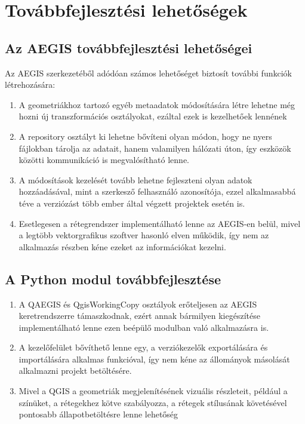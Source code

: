 \section{Továbbfejlesztési lehetőségek}
\subsection{Az AEGIS továbbfejlesztési lehetőségei}
Az AEGIS szerkezetéből adódóan számos lehetőséget biztosít további funkciók létrehozására:
\begin{enumerate}
	\item A geometriákhoz tartozó egyéb metaadatok módosítására létre lehetne még hozni új transzformációs osztályokat, ezáltal ezek is kezelhetőek lennének
	\item A repository osztályt ki lehetne bővíteni olyan módon, hogy ne nyers fájlokban tárolja az adatait, hanem valamilyen hálózati úton, így eszközök közötti kommunikáció is megvalósítható lenne.
	\item A módosítások kezelését tovább lehetne fejleszteni olyan adatok hozzáadásával, mint a szerkesző felhasználó azonosítója, ezzel alkalmasabbá téve a verziózást több ember által végzett projektek esetén is.
	\item Esetlegesen a rétegrendszer implementálható lenne az AEGIS-en belül, mivel a legtöbb vektorgrafikus szoftver hasonló elven működik, így nem az alkalmazás részben kéne ezeket az információkat kezelni.
\end{enumerate}
\subsection{A Python modul továbbfejlesztése}
\begin{enumerate}
	\item A QAEGIS és QgisWorkingCopy osztályok erőteljesen az AEGIS keretrendszerre támaszkodnak, ezért annak bármilyen kiegészítése implementálható lenne ezen beépülő modulban való alkalmazásra is.
	\item A kezelőfelület bővíthető lenne egy, a verziókezelők exportálására és importálására alkalmas funkcióval, így nem kéne az állományok másolását alkalmazni projekt betöltésére.
	\item Mivel a QGIS a geometriák megjelenítésének vizuális részleteit, például a színüket, a rétegekhez kötve szabályozza, a rétegek stílusának követésével pontosabb állapotbetöltésre lenne lehetőség
\end{enumerate}

